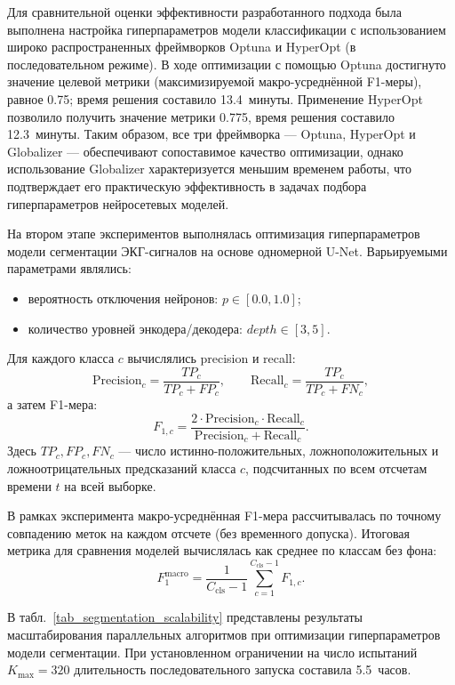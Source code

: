 \documentclass[10pt,a4paper]{book}
\begin{document}
Для сравнительной оценки эффективности разработанного подхода была выполнена настройка гиперпараметров модели классификации с использованием широко распространенных фреймворков Optuna и HyperOpt (в последовательном режиме). В ходе оптимизации с помощью Optuna достигнуто значение целевой метрики (максимизируемой макро-усреднённой F1-меры), равное 0.75; время решения составило 13.4~минуты. Применение HyperOpt позволило получить значение метрики 0.775, время решения составило 12.3~минуты. Таким образом, все три фреймворка --- Optuna, HyperOpt и Globalizer --- обеспечивают сопоставимое качество оптимизации, однако использование Globalizer характеризуется меньшим временем работы, что подтверждает его практическую эффективность в задачах подбора гиперпараметров нейросетевых моделей.

На втором этапе экспериментов выполнялась оптимизация гиперпараметров модели сегментации ЭКГ-сигналов на основе одномерной U-Net. Варьируемыми параметрами являлись:
\begin{itemize}
    \item вероятность отключения нейронов: $p \in [0.0, 1.0]$;
    \item количество уровней энкодера/декодера: $depth \in [3, 5]$.
\end{itemize}

Для каждого класса $c$ вычислялись precision и recall:
\[
\mathrm{Precision}_c=\frac{TP_c}{TP_c+FP_c}, \qquad
\mathrm{Recall}_c=\frac{TP_c}{TP_c+FN_c},
\]
а затем F1-мера:
\[
F_{1,c} = \frac{2\cdot \mathrm{Precision}_c\cdot \mathrm{Recall}_c}{\mathrm{Precision}_c+\mathrm{Recall}_c}.
\]
Здесь $TP_c, FP_c, FN_c$ --- число истинно-положительных, ложноположительных и ложноотрицательных предсказаний класса $c$, подсчитанных по всем отсчетам времени $t$ на всей выборке.

В рамках эксперимента макро-усреднённая F1-мера рассчитывалась по точному совпадению меток на каждом отсчете (без временного допуска). Итоговая метрика для сравнения моделей вычислялась как среднее по классам без фона:
\[
F_1^{\mathrm{macro}} = \frac{1}{C_{\mathrm{cls}}-1}\sum_{c=1}^{C_{\mathrm{cls}}-1} F_{1,c}.
\]

В табл.~\ref{tab_segmentation_scalability} представлены результаты масштабирования параллельных алгоритмов при оптимизации гиперпараметров модели сегментации. При установленном ограничении на число испытаний $K_{\max} = 320$ длительность последовательного запуска составила 5.5~часов.
\end{document}
